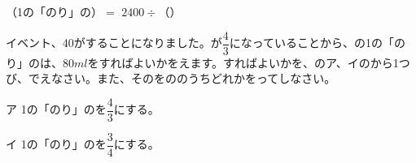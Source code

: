 \documentclass[
  12pt,a4paper,lualatex,ja=standard]{bxjsarticle}
\begin{document}
\begin{flushleft}
\begin{center}
\begin{framed}
（1の「のり」の）$=$ $2400 \div$（） 
\end{framed}
\end{center}


\hspace*{1em} イベント、40がすることになりました。が$\dfrac{4}{3}$になっていることから、の1の「のり」のは、$80\si{ml}$をすればよいかをえます。すればよいかを、のア、イのから1つび、でえなさい。また、そのをののうちどれかをってしなさい。

\begin{center}
\begin{framed}
\hspace{3em}  \hspace{3em}  \hspace{3em}  \hspace{3em}
\end{framed}
\end{center}

\hspace*{1em} ア \hspace{1em} 1の「のり」のを$\dfrac{4}{3}$にする。

\hspace*{1em} イ \hspace{1em} 1の「のり」のを$\dfrac{3}{4}$にする。

\vfill

\end{flushleft}
\end{document}
